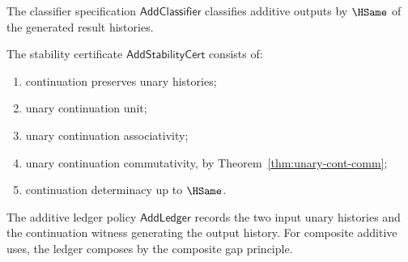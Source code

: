 \begin{definition}
\label{def:additive-classifier-specification}
The classifier specification \(\mathsf{AddClassifier}\) classifies additive outputs by \(\HSame\) of the generated result histories.
\end{definition}

\begin{definition}
\label{def:additive-stability-certificate}
The stability certificate \(\mathsf{AddStabilityCert}\) consists of:
\begin{enumerate}
  \item continuation preserves unary histories;
  \item unary continuation unit;
  \item unary continuation associativity;
  \item unary continuation commutativity, by Theorem~\ref{thm:unary-cont-comm};
  \item continuation determinacy up to \(\HSame\).
\end{enumerate}
\end{definition}

\begin{definition}
\label{def:additive-stability-and-ledger-policy}
The additive ledger policy \(\mathsf{AddLedger}\) records the two input unary histories and the continuation witness generating the output history. For composite additive uses, the ledger composes by the composite gap principle.
\end{definition}

